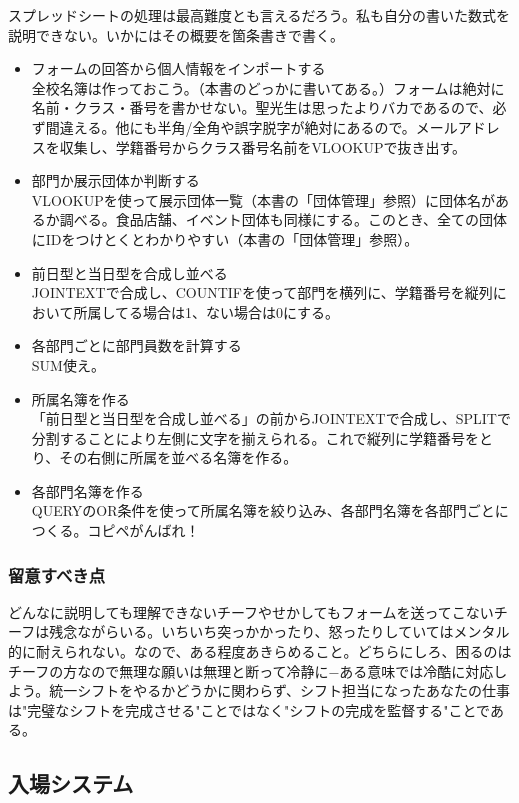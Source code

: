 \documentclass[dvipdfmx,jb5]{jarticle}
\begin{document}
 スプレッドシートの処理は最高難度とも言えるだろう。私も自分の書いた数式を説明できない。いかにはその概要を箇条書きで書く。
   \begin{itemize}
  \item フォームの回答から個人情報をインポートする\\
  全校名簿は作っておこう。（本書のどっかに書いてある。）フォームは絶対に名前・クラス・番号を書かせない。聖光生は思ったよりバカであるので、必ず間違える。他にも半角/全角や誤字脱字が絶対にあるので。メールアドレスを収集し、学籍番号からクラス番号名前をVLOOKUPで抜き出す。
   \item 部門か展示団体か判断する\\
 VLOOKUPを使って展示団体一覧（本書の「団体管理」参照）に団体名があるか調べる。食品店舗、イベント団体も同様にする。このとき、全ての団体にIDをつけとくとわかりやすい（本書の「団体管理」参照）。
  \item 前日型と当日型を合成し並べる\\
  JOINTEXTで合成し、COUNTIFを使って部門を横列に、学籍番号を縦列において所属してる場合は1、ない場合は0にする。
  \item 各部門ごとに部門員数を計算する\\
  SUM使え。
  \item 所属名簿を作る\\
  「前日型と当日型を合成し並べる」の前からJOINTEXTで合成し、SPLITで分割することにより左側に文字を揃えられる。これで縦列に学籍番号をとり、その右側に所属を並べる名簿を作る。
   \item 各部門名簿を作る\\
   QUERYのOR条件を使って所属名簿を絞り込み、各部門名簿を各部門ごとにつくる。コピペがんばれ！
  \end{itemize}

  \subsubsection{留意すべき点}
  どんなに説明しても理解できないチーフやせかしてもフォームを送ってこないチーフは残念ながらいる。いちいち突っかかったり、怒ったりしていてはメンタル的に耐えられない。なので、ある程度あきらめること。どちらにしろ、困るのはチーフの方なので無理な願いは無理と断って冷静に−ある意味では冷酷に対応しよう。統一シフトをやるかどうかに関わらず、シフト担当になったあなたの仕事は"完璧なシフトを完成させる"ことではなく"シフトの完成を監督する"ことである。
 \subsection{入場システム}
\end{document}
